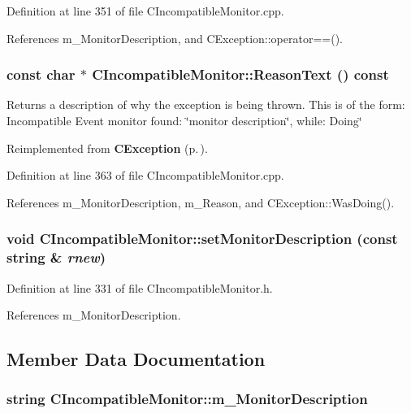 Definition at line 351 of file CIncompatible\-Monitor.cpp.

References m\_\-Monitor\-Description, and CException::operator==().
\subsubsection{\setlength{\rightskip}{0pt plus 5cm}const char $\ast$ CIncompatible\-Monitor::Reason\-Text () const\hspace{0.3cm}{\tt  [virtual]}}\label{classCIncompatibleMonitor_a7}


Returns a description of why the exception is being thrown. This is of the form: Incompatible Event monitor found: \char`\"{}monitor description\char`\"{}, while: Doing\char`\"{} 

Reimplemented from {\bf CException} {\rm (p.\,\pageref{classCException_a8})}.

Definition at line 363 of file CIncompatible\-Monitor.cpp.

References m\_\-Monitor\-Description, m\_\-Reason, and CException::Was\-Doing().
\subsubsection{\setlength{\rightskip}{0pt plus 5cm}void CIncompatible\-Monitor::set\-Monitor\-Description (const string \& {\em rnew})\hspace{0.3cm}{\tt  [inline]}}\label{classCIncompatibleMonitor_a6}




Definition at line 331 of file CIncompatible\-Monitor.h.

References m\_\-Monitor\-Description.

\subsection{Member Data Documentation}
\subsubsection{\setlength{\rightskip}{0pt plus 5cm}string CIncompatible\-Monitor::m\_\-Monitor\-Description\hspace{0.3cm}{\tt  [private]}}\label{classCIncompatibleMonitor_o0}




